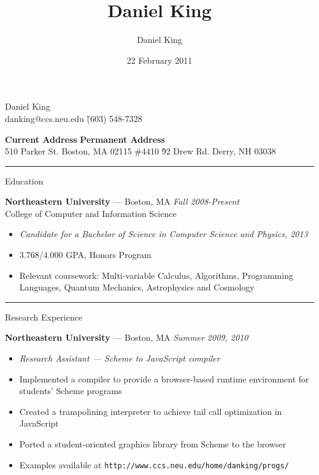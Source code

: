 \documentclass[10pt]{letter}
\author{Daniel King}
\title{Daniel King}
\date{22 February 2011}
\begin{document}
\begin{tabbing}{\Huge Daniel King} \\
\normalsize danking@ccs.neu.edu \`(603) 548-7328
\end{tabbing}

\vspace{-10pt}
\begin{tabbing}
\textbf{Current Address} \`\textbf{Permanent Address}\\
510 Parker St. Boston, MA 02115 \#4410 \`92 Drew Rd. Derry, NH 03038
\end{tabbing}\vspace{-15pt}
\rule{\linewidth}{.5pt}

{\Large Education}
\begin{tabbing}
{\large \bf Northeastern University} --- Boston, MA \` \textit{Fall 2008-Present} \\
College of Computer and Information Science
\end{tabbing}\vspace{-10pt}

\begin{itemize}
\setlength\itemsep{1pt}
\item[] \textit{Candidate for a Bachelor of Science in Computer Science and Physics, 2013}
\item 3.768/4.000 GPA, Honors Program
\item Relevant coursework: Multi-variable Calculus, Algorithms, Programming Languages, Quantum Mechanics, Astrophysics and Cosmology
\end{itemize}

\rule{\linewidth}{.5pt}

{\Large Research Experience}

\begin{tabbing}
{\large \bf Northeastern University} --- Boston, MA \` \textit{Summer 2009, 2010}

\end{tabbing}
\begin{itemize}
\setlength\itemsep{1pt}
\item [] \textit{Research Assistant --- Scheme to JavaScript compiler}
\item Implemented a compiler to provide a browser-based runtime environment for students' Scheme programs
\item Created a trampolining interpreter to achieve tail call optimization in JavaScript
\item Ported a student-oriented graphics library from Scheme to the browser
\item Examples available at \texttt{http://www.ccs.neu.edu/home/danking/progs/}
\end{itemize}
\end{document}
